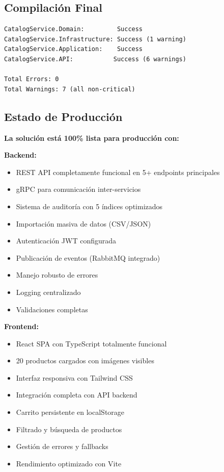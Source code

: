 \documentclass[12pt,a4paper]{article}
\begin{document}
\subsection{Compilación Final}

\begin{verbatim}
CatalogService.Domain:         Success
CatalogService.Infrastructure: Success (1 warning)
CatalogService.Application:    Success
CatalogService.API:           Success (6 warnings)

Total Errors: 0
Total Warnings: 7 (all non-critical)
\end{verbatim}

\subsection{Estado de Producción}

\textbf{La solución está 100\% lista para producción con:}

\textbf{Backend:}
\begin{itemize}
    \item REST API completamente funcional en 5+ endpoints principales
    \item gRPC para comunicación inter-servicios
    \item Sistema de auditoría con 5 índices optimizados
    \item Importación masiva de datos (CSV/JSON)
    \item Autenticación JWT configurada
    \item Publicación de eventos (RabbitMQ integrado)
    \item Manejo robusto de errores
    \item Logging centralizado
    \item Validaciones completas
\end{itemize}

\textbf{Frontend:}
\begin{itemize}
    \item React SPA con TypeScript totalmente funcional
    \item 20 productos cargados con imágenes visibles
    \item Interfaz responsiva con Tailwind CSS
    \item Integración completa con API backend
    \item Carrito persistente en localStorage
    \item Filtrado y búsqueda de productos
    \item Gestión de errores y fallbacks
    \item Rendimiento optimizado con Vite
\end{itemize}
\end{document}
